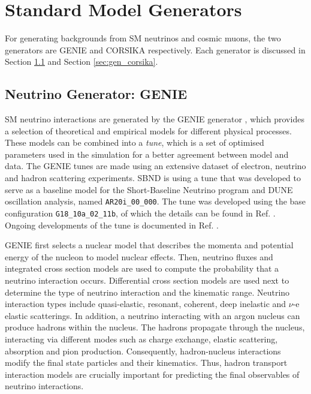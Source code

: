 \section{Standard Model Generators}
\label{sec:gen_sm}

For generating backgrounds from SM neutrinos and cosmic muons, the two generators are GENIE \cite{genie} and CORSIKA \cite{corsika} respectively.
Each generator is discussed in Section \ref{sec:gen_genie} and Section \ref{sec:gen_corsika}.

\subsection{Neutrino Generator: GENIE}
\label{sec:gen_genie}

SM neutrino interactions are generated by the GENIE generator \cite{genie}, which provides a selection of theoretical and empirical models for different physical processes.
These models can be combined into a \textit{tune}, which is a set of optimised parameters used in the simulation for a better agreement between model and data.
The GENIE tunes are made using an extensive dataset of electron, neutrino and hadron scattering experiments.
SBND is using a tune that was developed to serve as a baseline model for the Short-Baseline Neutrino program and DUNE oscillation analysis, named \texttt{AR20i\_00\_000}.
The tune was developed using the base configuration \texttt{G18\_10a\_02\_11b}, of which the details can be found in Ref. \cite{genie_tune}.
Ongoing developments of the tune is documented in Ref. \cite{genie_tune_github}.  

GENIE first selects a nuclear model that describes the momenta and potential energy of the nucleon to model nuclear effects.
Then, neutrino fluxes and integrated cross section models are used to compute the probability that a neutrino interaction occurs.
Differential cross section models are used next to determine the type of neutrino interaction and the kinematic range.
Neutrino interaction types include quasi-elastic, resonant, coherent, deep inelastic and $\nu$-e elastic scatterings.
In addition, a neutrino interacting with an argon nucleus can produce hadrons within the nucleus.
The hadrons propagate through the nucleus, interacting via different modes such as charge exchange, elastic scattering, absorption and pion production.
Consequently, hadron-nucleus interactions modify the final state particles and their kinematics.
Thus, hadron transport interaction models are crucially important for predicting the final observables of neutrino interactions.

